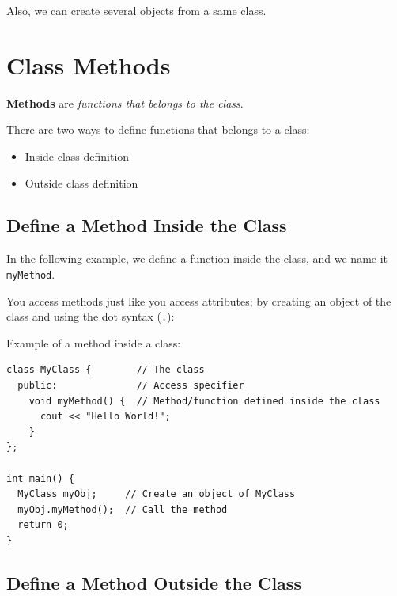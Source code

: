 \documentclass[../basic_programs.tex]{subfiles}
\begin{document}
    \begin{obs}
        Also, we can create several objects from a same class.
    \end{obs}

    \section{Class Methods}

    \begin{mydef}
        \textbf{Methods} are \textit{functions that belongs to the class}.
    \end{mydef}

    There are two ways to define functions that belongs to a class:

    \begin{itemize}
        \item Inside class definition
        \item Outside class definition
    \end{itemize}

    \subsection{Define a Method Inside the Class}

    In the following example, we define a function inside the class, and we name it \lstinline|myMethod|.

    \begin{idea}
        You access methods just like you access attributes; by creating an object of the class and using the dot syntax (\lstinline|.|):
    \end{idea}

    \begin{exa}
        Example of a method inside a class:
        \begin{lstlisting}[caption={caption},label=DescriptiveLabel]
class MyClass {        // The class
  public:              // Access specifier
    void myMethod() {  // Method/function defined inside the class
      cout << "Hello World!";
    }
};

int main() {
  MyClass myObj;     // Create an object of MyClass
  myObj.myMethod();  // Call the method
  return 0;
}
        \end{lstlisting}
    \end{exa}

    \subsection{Define a Method Outside the Class}
\end{document}
